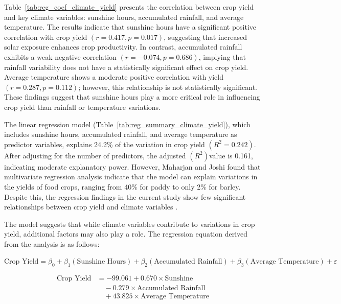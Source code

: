 Table~\ref{tab:reg_coef_climate_yield} presents the correlation between crop yield and key climate variables: sunshine hours, accumulated rainfall, and average temperature.  The results indicate that sunshine hours have a significant positive correlation with crop yield $(r=0.417,p=0.017)$, suggesting that increased solar exposure enhances crop productivity. In contrast, accumulated rainfall exhibits a weak negative correlation $(r=-0.074,p=0.686)$, implying that rainfall variability does not have a statistically significant effect on crop yield. Average temperature shows a moderate positive correlation with yield $(r=0.287,p=0.112)$; however, this relationship is not statistically significant. These findings suggest that sunshine hours play a more critical role in influencing crop yield than rainfall or temperature variations.

The linear regression model (Table~\ref{tab:reg_summary_climate_yield}), which includes sunshine hours, accumulated rainfall, and average temperature as predictor variables, explains 24.2\% of the variation in crop yield $(R^2 = 0.242)$. After adjusting for the number of predictors, the adjusted $(R^2) $value is 0.161, indicating moderate explanatory power. However, Maharjan and Joshi found that multivariate regression analysis indicate that the model can explain variations in the yields of food crops, ranging from 40\% for paddy to only 2\% for barley. Despite this, the regression findings in the current study show few significant relationships between crop yield and climate variables  \citep{maharjanEffectClimateVariables2013}.

The model suggests that while climate variables contribute to variations in crop yield, additional factors may also play a role. The regression equation derived from the analysis is as follows:  

$
\text{Crop Yield} = \beta_0 + \beta_1 (\text{Sunshine Hours}) + \beta_2 (\text{Accumulated Rainfall}) + \beta_3 (\text{Average Temperature}) + \varepsilon
$

\begin{equation}
    \begin{split}
        \text{Crop Yield} &= -99.061 + 0.670 \times \text{Sunshine} \\
        &\quad - 0.279 \times \text{Accumulated Rainfall} \\
        &\quad + 43.825 \times \text{Average Temperature}
    \end{split}
\end{equation}

